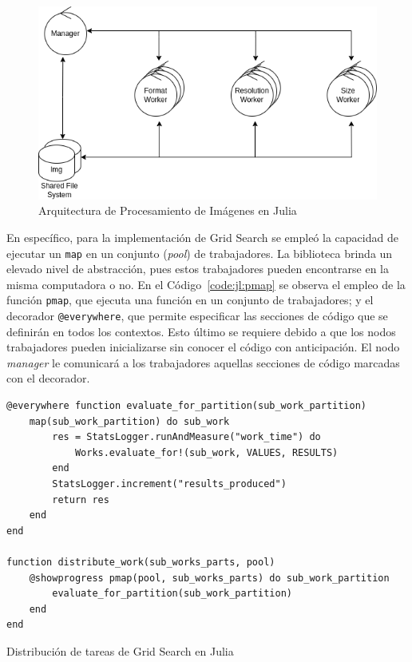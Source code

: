\documentclass[11pt]{article}
\newcommand{\english}[1]{\textit{#1}}
\begin{document}
\begin{figure}[ht]
    \centering
    \includegraphics[scale=0.4]{resources/distributed_systems/jl/image_processing_arch.png}
    \caption{Arquitectura de Procesamiento de Imágenes en Julia}
    \label{fig:jl:image_processing_arch}
\end{figure}

En específico, para la implementación de Grid Search se empleó la capacidad de ejecutar un \lstinline{map} en un conjunto (\english{pool}) de trabajadores. La biblioteca brinda un elevado nivel de abstracción, pues estos trabajadores pueden encontrarse en la misma computadora o no. En el Código~\ref{code:jl:pmap} se observa el empleo de la función \lstinline{pmap}, que ejecuta una función en un conjunto de trabajadores; y el decorador \lstinline{@everywhere}, que permite especificar las secciones de código que se definirán en todos los contextos. Esto último se requiere debido a que los nodos trabajadores pueden inicializarse sin conocer el código con anticipación. El nodo \english{manager} le comunicará a los trabajadores aquellas secciones de código marcadas con el decorador.

\begin{listing}[ht]
\begin{verbatim}
@everywhere function evaluate_for_partition(sub_work_partition)
    map(sub_work_partition) do sub_work
        res = StatsLogger.runAndMeasure("work_time") do
            Works.evaluate_for!(sub_work, VALUES, RESULTS)
        end
        StatsLogger.increment("results_produced")
        return res
    end
end

function distribute_work(sub_works_parts, pool)
    @showprogress pmap(pool, sub_works_parts) do sub_work_partition
        evaluate_for_partition(sub_work_partition)
    end
end
\end{verbatim}
\caption{Distribución de tareas de Grid Search en Julia}
\label{code:jl:pmap}
\end{listing}
\end{document}
